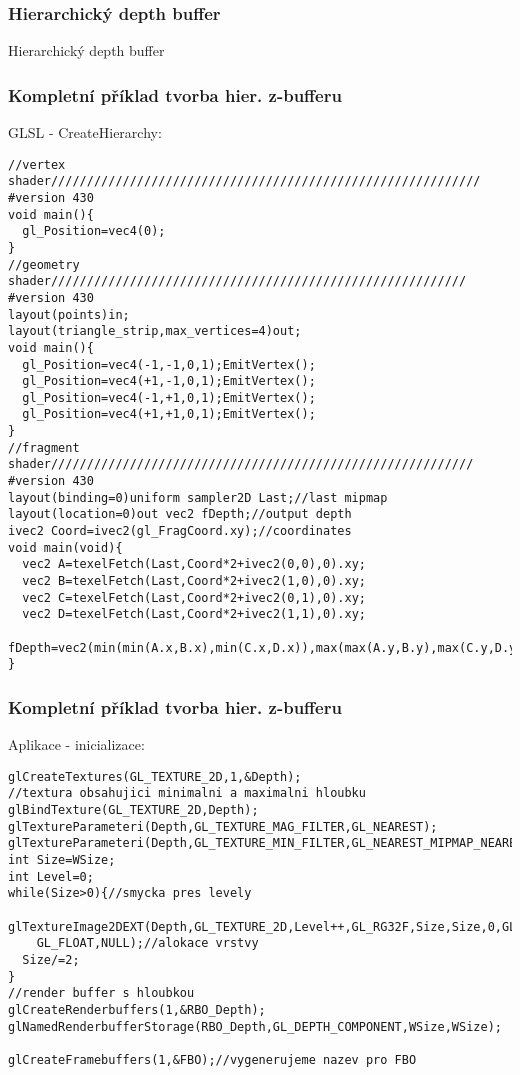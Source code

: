 \begin{frame}
\frametitle{Hierarchický depth buffer}
\begin{center}
\Huge {\color{white}Hierarchický depth buffer}
\end{center}
\end{frame}

\begin{frame}[fragile]
\frametitle{Kompletní příklad tvorba hier. z-bufferu}
		GLSL - CreateHierarchy:
{\tiny
\begin{verbatim}
//vertex shader////////////////////////////////////////////////////////////
#version 430
void main(){
  gl_Position=vec4(0);
}
//geometry shader//////////////////////////////////////////////////////////
#version 430
layout(points)in;
layout(triangle_strip,max_vertices=4)out;
void main(){
  gl_Position=vec4(-1,-1,0,1);EmitVertex();
  gl_Position=vec4(+1,-1,0,1);EmitVertex();
  gl_Position=vec4(-1,+1,0,1);EmitVertex();
  gl_Position=vec4(+1,+1,0,1);EmitVertex();
}
//fragment shader///////////////////////////////////////////////////////////
#version 430
layout(binding=0)uniform sampler2D Last;//last mipmap
layout(location=0)out vec2 fDepth;//output depth
ivec2 Coord=ivec2(gl_FragCoord.xy);//coordinates
void main(void){
  vec2 A=texelFetch(Last,Coord*2+ivec2(0,0),0).xy;
  vec2 B=texelFetch(Last,Coord*2+ivec2(1,0),0).xy;
  vec2 C=texelFetch(Last,Coord*2+ivec2(0,1),0).xy;
  vec2 D=texelFetch(Last,Coord*2+ivec2(1,1),0).xy;
  fDepth=vec2(min(min(A.x,B.x),min(C.x,D.x)),max(max(A.y,B.y),max(C.y,D.y)));
}
		\end{verbatim}
		}
\end{frame}

\begin{frame}[fragile]
\frametitle{Kompletní příklad tvorba hier. z-bufferu}
		Aplikace - inicializace:
{\scriptsize
\begin{verbatim}
glCreateTextures(GL_TEXTURE_2D,1,&Depth);
//textura obsahujici minimalni a maximalni hloubku
glBindTexture(GL_TEXTURE_2D,Depth);
glTextureParameteri(Depth,GL_TEXTURE_MAG_FILTER,GL_NEAREST);
glTextureParameteri(Depth,GL_TEXTURE_MIN_FILTER,GL_NEAREST_MIPMAP_NEAREST);
int Size=WSize;
int Level=0;
while(Size>0){//smycka pres levely
  glTextureImage2DEXT(Depth,GL_TEXTURE_2D,Level++,GL_RG32F,Size,Size,0,GL_RG,
    GL_FLOAT,NULL);//alokace vrstvy
  Size/=2;
}
//render buffer s hloubkou
glCreateRenderbuffers(1,&RBO_Depth);
glNamedRenderbufferStorage(RBO_Depth,GL_DEPTH_COMPONENT,WSize,WSize);

glCreateFramebuffers(1,&FBO);//vygenerujeme nazev pro FBO
		\end{verbatim}
		}
\end{frame}


